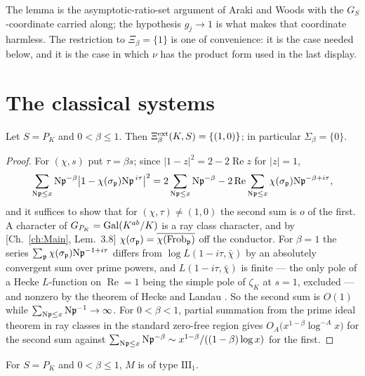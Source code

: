 The lemma is the asymptotic-ratio-set argument of Araki and Woods \cite{AW} with the
$G_S$-coordinate carried along; the hypothesis $g_j\to1$ is what makes that coordinate
harmless. The restriction to $\Xi_\beta=\{1\}$ is one of convenience: it is the case needed
below, and it is the case in which $\nu$ has the product form used in the last display.

\section{The classical systems}\label{I:sec:classical}

\begin{proposition}[The slices for $S=P_K$]\label{I:prop:slices}
Let $S=P_K$ and $0<\beta\le1$. Then $\Xi^{\mathrm{ext}}_\beta(K,S)=\{(1,0)\}$; in particular
$\Sigma_\beta=\{0\}$.
\end{proposition}

\begin{proof}
For $(\chi,s)$ put $\tau=\beta s$; since $|1-z|^2=2-2\operatorname{Re}z$ for $|z|=1$,
\begin{equation}\label{I:eq:twosums}
\sum_{\mathrm{N}\mathfrak{p}\le x}\mathrm{N}\mathfrak{p}^{-\beta}\bigl|1-\chi(\sigma_{\mathfrak{p}})\mathrm{N}\mathfrak{p}^{\,i\tau}\bigr|^2
=2\sum_{\mathrm{N}\mathfrak{p}\le x}\mathrm{N}\mathfrak{p}^{-\beta}-2\operatorname{Re}\sum_{\mathrm{N}\mathfrak{p}\le x}\chi(\sigma_{\mathfrak{p}})\mathrm{N}\mathfrak{p}^{-\beta+i\tau},
\end{equation}
and it suffices to show that for $(\chi,\tau)\ne(1,0)$ the second sum is $o$ of the first.
A character of $G_{P_K}=\operatorname{Gal}(K^{ab}/K)$ is a ray class character, and by
[Ch.~\ref{ch:Main}, Lem.~3.8] $\chi(\sigma_{\mathfrak{p}})=\overline{\chi(\operatorname{Frob}_{\mathfrak{p}})}$ off the conductor. For
$\beta=1$ the series $\sum_{\mathfrak{p}}\chi(\sigma_{\mathfrak{p}})\mathrm{N}\mathfrak{p}^{-1+i\tau}$ differs from
$\log L(1-i\tau,\bar\chi)$ by an absolutely convergent sum over prime powers, and
$L(1-i\tau,\bar\chi)$ is finite --- the only pole of a Hecke $L$-function on
$\operatorname{Re}=1$ being the simple pole of $\zeta_K$ at $s=1$, excluded --- and nonzero
by the theorem of Hecke and Landau \cite{Hecke,Landau}. So the second sum is $O(1)$ while
$\sum_{\mathrm{N}\mathfrak{p}\le x}\mathrm{N}\mathfrak{p}^{-1}\to\infty$. For $0<\beta<1$, partial summation from the prime
ideal theorem in ray classes in the standard zero-free region \cite{Landau} gives
$O_A\bigl(x^{1-\beta}\log^{-A}x\bigr)$ for the second sum against
$\sum_{\mathrm{N}\mathfrak{p}\le x}\mathrm{N}\mathfrak{p}^{-\beta}\sim x^{1-\beta}/((1-\beta)\log x)$ for the first.
\end{proof}

\begin{theorem}\label{I:thm:classical}
For $S=P_K$ and $0<\beta\le1$, $M$ is of type $\mathrm{III}_1$.
\end{theorem}

